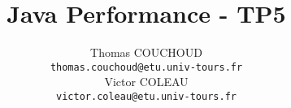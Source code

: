 \documentclass{report}
\title{Java Performance - TP5}
\author{Thomas COUCHOUD\\\texttt{thomas.couchoud@etu.univ-tours.fr}\\Victor COLEAU\\\texttt{victor.coleau@etu.univ-tours.fr}}
\begin{document}
	\mccTitle
	
\end{document}
